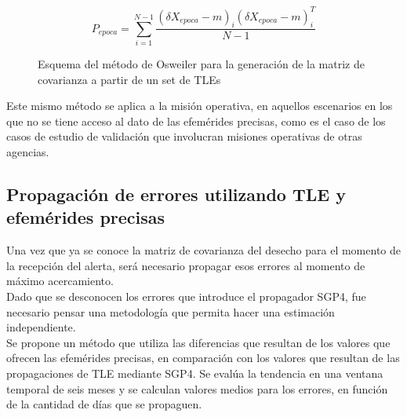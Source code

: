 \begin{equation}
 P_{epoca}=\sum_{i=1}^{N-1} \frac{(\delta X_{epoca}-m)_{i}(\delta X_{epoca}-m)_{i}^{T}}{N-1}
\end{equation}

\begin{figure}[!h]
\centering
{}
\caption[M\'etodo de Osweiler para la generaci\'on de la matriz de covarianza]{Esquema del m\'etodo de Osweiler para la generaci\'on de la matriz de covarianza a partir de un set de TLEs}
\label{fig:tleosw}
\end{figure}

Este mismo m\'etodo se aplica a la misi\'on operativa, en aquellos escenarios en los que no se tiene acceso al dato de las efem\'erides precisas, como es el caso de los casos de estudio de validaci\'on que involucran misiones operativas de otras agencias.\\

\subsection{Propagaci\'on de errores utilizando TLE y efem\'erides precisas}\label{subsec:tablaprop}
Una vez que ya se conoce la matriz de covarianza del desecho para el momento de la recepci\'on del alerta, ser\'a necesario propagar esos errores al momento de m\'aximo acercamiento.\\
Dado que se desconocen los errores que introduce el propagador SGP4, fue necesario pensar una metodolog\'ia que permita hacer una estimaci\'on independiente.\\
Se propone un m\'etodo que utiliza las diferencias que resultan de los valores que ofrecen las efem\'erides precisas, en comparaci\'on con los valores que resultan de las propagaciones de TLE mediante SGP4. Se eval\'ua la tendencia en una ventana temporal de seis meses y se calculan valores medios para los errores, en funci\'on de la cantidad de d\'ias que se propaguen.

